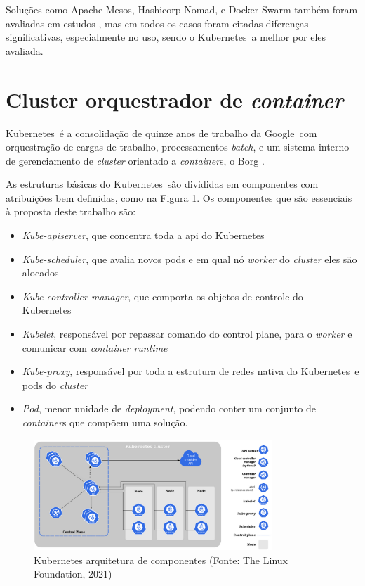 Soluções como Apache Mesos, Hashicorp Nomad, e Docker Swarm também foram avaliadas em estudos \cite{truyen_comprehensive_2021}, mas em todos os casos foram citadas diferenças significativas, especialmente no uso, sendo o Kubernetes\textregistered \ a melhor por eles avaliada. 

\section{Cluster orquestrador de \emph{container}}

Kubernetes\textregistered \ é a consolidação de quinze anos de trabalho da Google\textregistered \ com orquestração de cargas de trabalho, processamentos \emph{batch}, e um sistema interno de gerenciamento de \emph{cluster} orientado a \emph{container}s, o Borg \cite{verma_large-scale_2015}. 

As estruturas básicas do Kubernetes\textregistered \ são divididas em componentes com atribuições bem definidas, como na Figura \ref{fig:kubenode}. Os componentes que são essenciais à proposta deste trabalho são:
\begin{itemize}
    \item \emph{Kube-apiserver}, que concentra toda a api do Kubernetes\textregistered \
    \item \emph{Kube-scheduler}, que avalia novos pods e em qual nó \emph{worker} do \emph{cluster} eles são alocados
    \item \emph{Kube-controller-manager}, que comporta os objetos de controle do Kubernetes\textregistered \
    \item \emph{Kubelet}, responsável por repassar comando do control plane, para o \emph{worker} e comunicar com \emph{container} \emph{runtime}
    \item \emph{Kube-proxy}, responsável por toda a estrutura de redes nativa do Kubernetes\textregistered \ e pods do \emph{cluster}
    \item \emph{Pod}, menor unidade de \emph{deployment}, podendo conter um conjunto de \emph{container}s que compõem uma solução.
\end{itemize}

\begin{figure}[!h]
    \centering
    \includegraphics[width=0.8\textwidth]{04-figuras/kubeadm-node.png}
    \caption[Kubernetes arquitetura de componentes ]{Kubernetes arquitetura de componentes (Fonte: The Linux Foundation\textregistered, 2021)}
    \label{fig:kubenode}
\end{figure}



